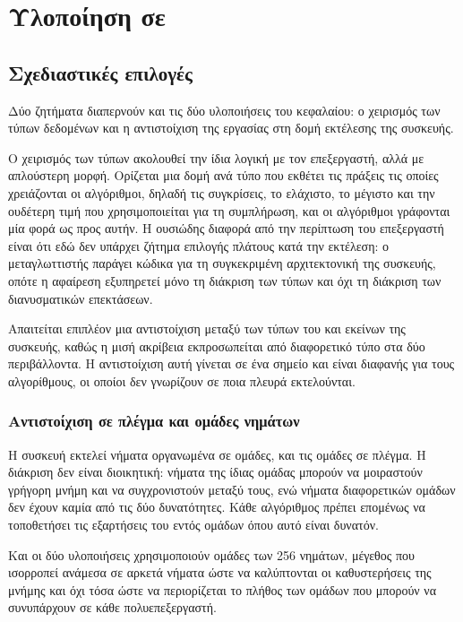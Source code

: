 \chapter{Υλοποίηση σε }
\label{ch:gpu}

\section{Σχεδιαστικές επιλογές}
\label{sec:gpu-design}

Δύο ζητήματα διαπερνούν και τις δύο υλοποιήσεις του κεφαλαίου: ο χειρισμός των
τύπων δεδομένων και η αντιστοίχιση της εργασίας στη δομή εκτέλεσης της συσκευής.

Ο χειρισμός των τύπων ακολουθεί την ίδια λογική με τον επεξεργαστή, αλλά με
απλούστερη μορφή. Ορίζεται μια δομή ανά τύπο που εκθέτει τις πράξεις τις οποίες
χρειάζονται οι αλγόριθμοι, δηλαδή τις συγκρίσεις, το ελάχιστο, το μέγιστο και
την ουδέτερη τιμή που χρησιμοποιείται για τη συμπλήρωση, και οι αλγόριθμοι
γράφονται μία φορά ως προς αυτήν. Η ουσιώδης διαφορά από την περίπτωση του
επεξεργαστή είναι ότι εδώ δεν υπάρχει ζήτημα επιλογής πλάτους κατά την
εκτέλεση: ο μεταγλωττιστής παράγει κώδικα για τη συγκεκριμένη αρχιτεκτονική της
συσκευής, οπότε η αφαίρεση εξυπηρετεί μόνο τη διάκριση των τύπων και όχι τη
διάκριση των διανυσματικών επεκτάσεων.

Απαιτείται επιπλέον μια αντιστοίχιση μεταξύ των τύπων του  και εκείνων
της συσκευής, καθώς η μισή ακρίβεια εκπροσωπείται από διαφορετικό τύπο στα δύο
περιβάλλοντα. Η αντιστοίχιση αυτή γίνεται σε ένα σημείο και είναι διαφανής για
τους αλγορίθμους, οι οποίοι δεν γνωρίζουν σε ποια πλευρά εκτελούνται.

\subsection{Αντιστοίχιση σε πλέγμα και ομάδες νημάτων}
\label{sec:gpu-mapping}

Η συσκευή εκτελεί νήματα οργανωμένα σε ομάδες, και τις ομάδες σε πλέγμα. Η
διάκριση δεν είναι διοικητική: νήματα της ίδιας ομάδας μπορούν να μοιραστούν
γρήγορη μνήμη και να συγχρονιστούν μεταξύ τους, ενώ νήματα διαφορετικών ομάδων
δεν έχουν καμία από τις δύο δυνατότητες. Κάθε αλγόριθμος πρέπει επομένως να
τοποθετήσει τις εξαρτήσεις του εντός ομάδων όπου αυτό είναι δυνατόν.

Και οι δύο υλοποιήσεις χρησιμοποιούν ομάδες των 256 νημάτων, μέγεθος που
ισορροπεί ανάμεσα σε αρκετά νήματα ώστε να καλύπτονται οι καθυστερήσεις της
μνήμης και όχι τόσα ώστε να περιορίζεται το πλήθος των ομάδων που μπορούν να
συνυπάρχουν σε κάθε πολυεπεξεργαστή.

